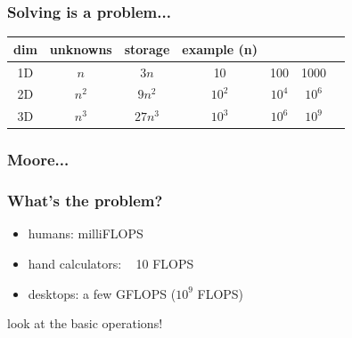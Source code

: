 \documentclass[10pt]{beamer}
\begin{document}
\begin{frame}
\frametitle{Solving is a problem...}

\begin{center}
\begin{tabular}{c c c c c c c}
dim & unknowns & storage & example (n)& & \\\hline
1D  &   $n$    &  $3n$   & 10 & 100 & 1000\\
2D  &   $n^2$  &  $9n^2$ & $10^2$ & $10^4$ & $10^6$\\
3D  &   $n^3$  &  $27n^3$& $10^3$ & $10^6$ & $10^9$\\
\end{tabular}

\end{center}
\end{frame}
\begin{frame}
\frametitle{Moore...}
\begin{center}
\end{center}
\end{frame}
\begin{frame}
\frametitle{What's the problem?}
\begin{itemize}
  \item humans: milliFLOPS
  \item hand calculators: ~ 10 FLOPS
  \item desktops: a few GFLOPS ($10^9$ FLOPS)
\end{itemize}

\begin{alertblock}{}
look at the basic operations!
\end{alertblock}
\end{frame}
\end{document}
